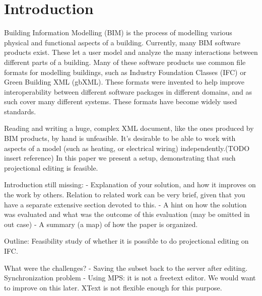 


\setcounter{page}{1}
\section{Introduction}
Building Information Modelling (BIM) is the process of modelling various physical and functional aspects of a building\cite{clar:eke}. Currently, many BIM software products exist. These let a user model and analyze the many interactions between different parts of a building. Many of these software products use common file formats for modelling buildings, such as Industry Foundation Classes (IFC) or Green Building XML (gbXML). These formats were invented to help improve interoperability between different software packages in different domains, and as such cover many different systems. These formats have become widely used standards.

Reading and writing a huge, complex XML document, like the ones produced by BIM products, by hand is unfeasible. It’s desirable to be able to work with aspects of a model (such as heating, or electrical wiring) independently.(TODO insert reference) In this paper we present a setup, demonstrating that such projectional editing is feasible.

Introduction still missing:
- Explanation of your solution, and how it improves on the work by others. Relation to related work can be very brief, given that you have a separate extensive section devoted to this.
- A hint on how the solution was evaluated and what was the outcome of this evaluation (may be omitted in out case)
- A summary (a map) of how the paper is organized.

\cite{nour08}

Outline:
Feasibility study of whether it is possible to do projectional editing on IFC.

What were the challenges?
- Saving the subset back to the server after editing. Synchronization problem
- Using MPS: it is not a freetext editor. We would want to improve on this later. XText is not flexible enough for this purpose.

